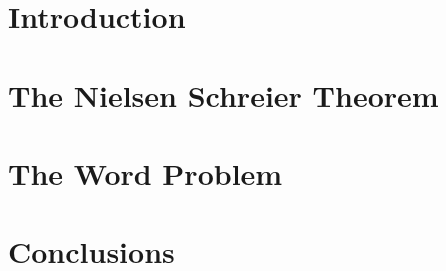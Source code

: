 \documentclass[12pt]{report}
\theoremstyle{definition}
\numberwithin{equation}{theorem}
\begin{document}


\tableofcontents

\chapter{Introduction}
\label{chap:intro}


\chapter{The Nielsen Schreier Theorem}
\label{chap:ns}


\chapter{The Word Problem}
\label{chap:wp}


\chapter{Conclusions}
\label{chap:conc}

\nocite{rotman1999introduction}


\end{document}
